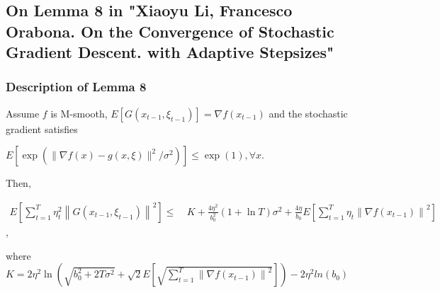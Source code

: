 \documentclass[14pt,onecolumn,letterpaper]{extarticle}
\begin{document}
\subsection{On Lemma 8 in "Xiaoyu Li, Francesco Orabona. On the Convergence of Stochastic Gradient Descent. with Adaptive Stepsizes"}
\subsubsection{Description of Lemma 8}
Assume $f$ is M-smooth, $E[G(x_{t-1},\xi_{t-1})]=\nabla f(x_{t-1})$ and the stochastic gradient satisfies \par\vspace{3mm}$E\left[\exp \left(\|\nabla f(x)-g(x, \xi)\|^2 / \sigma^2\right)\right] \leq \exp (1), \forall x$. \par\vspace{3mm} Then, \par\vspace{3mm}
$\begin{aligned} E\left[\sum_{t=1}^T \eta_t^2\left\|G\left(x_{t-1}, \xi_{t-1}\right)\right\|^2\right] \leq &\ K+\frac{4 \eta^2}{b_0^2}(1+\ln T) \sigma^2 +\frac{4 \eta}{b_0} E\left[\sum_{t=1}^T \eta_t\left\|\nabla f\left(x_{t-1}\right)\right\|^2\right]
\end{aligned}$, \par\vspace{4mm} where 
$K=2 \eta^2 \ln \left(\sqrt{b_0^2+2 T \sigma^2}+\sqrt{2} E\left[\sqrt{\sum_{t=1}^T\left\|\nabla f\left(x_{t-1}\right)\right\|^2}\right]\right)-2\eta^2 ln(b_0)$
\end{document}
